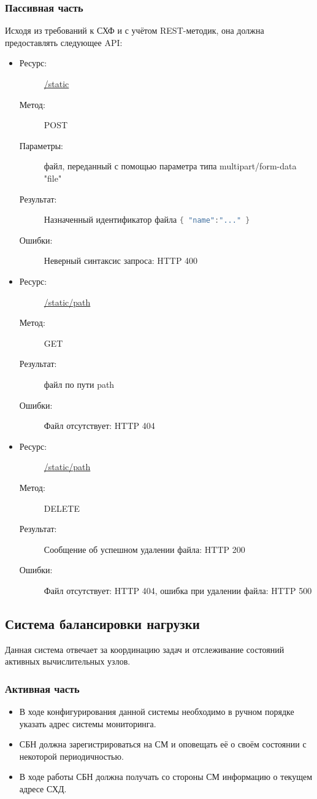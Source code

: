 \documentclass[a4paper,12pt]{report}
\numberwithin{equation}{section}
\begin{document}
  \subsubsection{Пассивная часть}
  Исходя из требований к СХФ и с учётом REST-методик, она должна предоставлять следующее API:
  
  \begin{itemize}
    \item
    \begin{description}
      \item[Ресурс:] \url{/static}
      \item[Метод:] POST
      \item[Параметры:] файл, переданный с помощью параметра типа multipart/form-data "file"
      \item[Результат:] Назначенный идентификатор файла
      \lstinline[language=Java]|{ "name":"..." }|
      \item[Ошибки:] Неверный синтаксис запроса: HTTP 400
    \end{description}
    \item
    \begin{description}
      \item[Ресурс:] \url{/static/path}
      \item[Метод:] GET
      \item[Результат:] файл по пути path
      \item[Ошибки:] Файл отсутствует: HTTP 404
    \end{description}
    \item
    \begin{description}
      \item[Ресурс:] \url{/static/path}
      \item[Метод:] DELETE
      \item[Результат:] Сообщение об успешном удалении файла: HTTP 200
      \item[Ошибки:] Файл отсутствует: HTTP 404, ошибка при удалении файла: HTTP 500
    \end{description}
  \end{itemize}
  
  \subsection{Система балансировки нагрузки}
  Данная система отвечает за координацию задач и отслеживание состояний активных вычислительных узлов. 
  
  \subsubsection{Активная часть}
  \begin{itemize}
    \item В ходе конфигурирования данной системы необходимо в ручном порядке указать адрес системы мониторинга.
    \item СБН должна зарегистрироваться на СМ и оповещать её о своём состоянии с некоторой периодичностью.
    \item В ходе работы СБН должна получать со стороны СМ информацию о текущем адресе СХД.
  \end{itemize}
  
\end{document}
